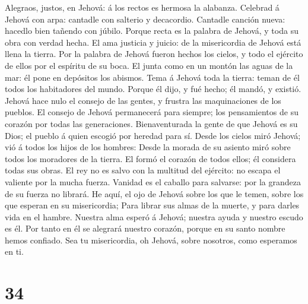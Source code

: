  Alegraos, justos, en Jehová: á los rectos es hermosa la
alabanza.  Celebrad á Jehová con arpa: cantadle con
salterio y decacordio.  Cantadle canción nueva: hacedlo
bien tañendo con júbilo.  Porque recta es la palabra de
Jehová, y toda su obra con verdad hecha.  El ama justicia
y juicio: de la misericordia de Jehová está llena la tierra.
 Por la palabra de Jehová fueron hechos los cielos, y todo
el ejército de ellos por el espíritu de su boca.  El junta
como en un montón las aguas de la mar: él pone en depósitos los abismos.
 Tema á Jehová toda la tierra: teman de él todos los
habitadores del mundo.  Porque él dijo, y fué hecho; él
mandó, y existió.  Jehová hace nulo el consejo de las
gentes, y frustra las maquinaciones de los pueblos.  El
consejo de Jehová permanecerá para siempre; los pensamientos de su
corazón por todas las generaciones.  Bienaventurada la
gente de que Jehová es su Dios; el pueblo á quien escogió por heredad
para sí.  Desde los cielos miró Jehová; vió á todos los
hijos de los hombres:  Desde la morada de su asiento miró
sobre todos los moradores de la tierra.  El formó el
corazón de todos ellos; él considera todas sus obras.  El
rey no es salvo con la multitud del ejército: no escapa el valiente por
la mucha fuerza.  Vanidad es el caballo para salvarse:
por la grandeza de su fuerza no librará.  He aquí, el ojo
de Jehová sobre los que le temen, sobre los que esperan en su
misericordia;  Para librar sus almas de la muerte, y para
darles vida en el hambre.  Nuestra alma esperó á Jehová;
nuestra ayuda y nuestro escudo es él.  Por tanto en él se
alegrará nuestro corazón, porque en su santo nombre hemos confiado.
 Sea tu misericordia, oh Jehová, sobre nosotros, como
esperamos en ti.

\hypertarget{section-33}{%
\section{34}\label{section-33}}

